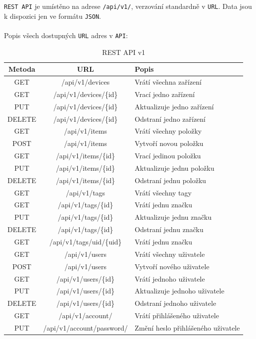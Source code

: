 \documentclass[czech,BP]{thesiskiv}
\begin{document}
		\texttt{REST API} je umístěno na adrese \texttt{/api/v1/}, verzování standardně v \texttt{URL}. Data jsou k dispozici jen ve formátu \texttt{JSON}. 
\\\\
Popis všech dostupných \texttt{URL} adres v \texttt{API}:
\begin{table}[H]
\centering
\begin{tabular}{ c | c | p{6cm}}
\textbf{Metoda} & \textbf{URL} & \textbf{Popis} \\ \hline\hline
 	
GET & /api/v1/devices & Vrátí všechna zařízení \\ \hline  
GET & /api/v1/devices/\{id\} & Vrací jedno zařízení \\ \hline
PUT & /api/v1/devices/\{id\} & Aktualizuje jedno zařízení \\ \hline
DELETE & /api/v1/devices/\{id\} & Odstraní jedno zařízení  \\ \hline

GET & /api/v1/items & Vrátí všechny položky \\ \hline
POST & /api/v1/items & Vytvoří novou položku \\ \hline
GET & /api/v1/items/\{id\} & Vrací jedinou položku \\ \hline
PUT & /api/v1/items/\{id\} & Aktualizuje jednu položku \\ \hline
DELETE & /api/v1/items/\{id\} & Odstraní jednu položku \\ \hline

GET & /api/v1/tags & Vrátí všechny tagy  \\ \hline
GET & /api/v1/tags/\{id\} & Vrátí jednu značku \\ \hline
PUT & /api/v1/tags/\{id\} & Aktualizuje jednu značku \\ \hline
DELETE & /api/v1/tags/\{id\} & Odstraní jednu značku \\ \hline
GET & /api/v1/tags/uid/\{uid\} & Vrátí jednu značku \\ \hline

GET & /api/v1/users & Vrátí všechny uživatele \\ \hline
POST & /api/v1/users & Vytvoří nového uživatele \\ \hline
GET & /api/v1/users/\{id\} & Vrátí jednoho uživatele \\ \hline
PUT & /api/v1/users/\{id\} & Aktualizuje jednoho uživatele \\ \hline
DELETE & /api/v1/users/\{id\} & Odstraní jednoho uživatele \\ \hline

GET & /api/v1/account/ & Vrátí přihlášeného uživatele  \\ \hline
PUT & /api/v1/account/password/ & Změní heslo přihlášeného uživatele \\ \hline    
\end{tabular}
\caption{REST API v1}
\label{table:api}
\end{table}
\end{document}
